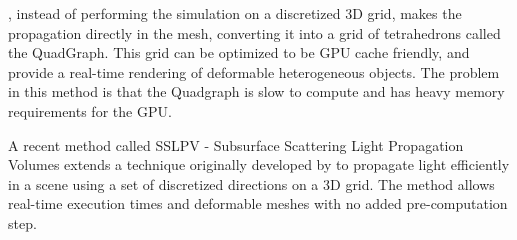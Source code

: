 \cite{journals/cgf/WangWHSYG10}, instead of performing the simulation on a discretized 3D grid, makes the propagation directly in the mesh, converting it into a grid of tetrahedrons called the QuadGraph. This grid can be optimized to be GPU cache friendly, and provide a real-time rendering of deformable heterogeneous objects. The problem in this method is that the Quadgraph is slow to compute and has heavy memory requirements for the GPU. 

A recent method called SSLPV - Subsurface Scattering Light Propagation Volumes \citep{Borlum:2011:SSL:2018323.2018325} extends a technique originally developed by \cite{Kaplanyan:2010:CLP:1730804.1730821} to propagate light efficiently in a scene using a set of discretized directions on a 3D grid. The method allows real-time execution times and deformable meshes with no added pre-computation step. 

